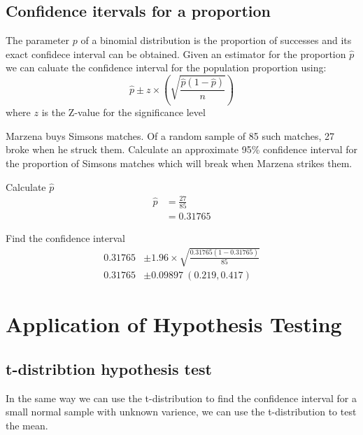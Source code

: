     \subsection{Confidence itervals for a proportion}
        The parameter $p$ of a binomial distribution is the proportion of successes and its exact confidece interval can be obtained. Given an estimator for the proportion $\hat{p}$ we can caluate the confidence interval for the population proportion using: 
        $$\hat{p} \pm z \times \left(\sqrt{\frac{\hat{p}(1-\hat{p})}{n}}\right)$$ 
        where $z$ is the Z-value for the significance level

        \begin{example}
        {
            Marzena buys Simsons matches. Of a random sample of 85 such matches, 27 broke when he struck them. Calculate an approximate 95\% confidence interval for the proportion of Simsons matches which will break when Marzena strikes them.
        }

        \begin{step}{Calculate $\hat{p}$}
        \begin{align*}
        \hat{p} &= \frac{27}{85} \\
                &= 0.31765
        \end{align*}
        \end{step}

        \begin{step}{Find the confidence interval}
        \begin{align*}
        0.31765 &\pm 1.96 \times \sqrt{\frac{0.31765(1-0.31765)}{85}} \\ 
        0.31765 &\pm 0.09897\ (0.219, 0.417) 
        \end{align*}
        \end{step}

        \end{example}

\section{Application of Hypothesis Testing}


    \subsection{t-distribtion hypothesis test}
        In the same way we can use the t-distribution to find the confidence interval for a small normal sample with unknown varience, we can use the t-distribution to test the mean.

